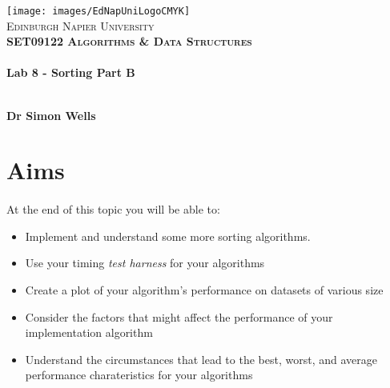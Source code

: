 \documentclass[10pt, a4paper, twosize]{article}
\begin{document}

\begin{titlepage}
\vspace*{5cm}
\begin{center}
\texttt{[image: images/EdNapUniLogoCMYK]}~\\[1cm]

\textsc{\Large Edinburgh Napier University}\\[1.5cm]

\textsc{\LARGE \bfseries SET09122 Algorithms \& Data Structures}\\[0.5cm]

\hrulefill \\[0.4cm]
{\huge \bfseries Lab 8 - Sorting Part B \\[0.4cm] }
\hrulefill \\[1.5cm]

\begin{minipage}{0.4\textwidth}
\begin{flushleft} \large
\textbf{Dr Simon Wells} \\
\end{flushleft}
\end{minipage}

\vfill

\end{center}
\end{titlepage}




%

\section{Aims}
\paragraph{} At the end of this topic you will be able to:

\begin{itemize}
\item Implement and understand some more sorting algorithms.
\item Use your timing \emph{test harness} for your algorithms
\item Create a plot of your algorithm's performance on datasets of various size
\item Consider the factors that might affect the performance of your implementation algorithm
\item Understand the circumstances that lead to the best, worst, and average performance charateristics for your algorithms
\end{itemize}
\end{document}
